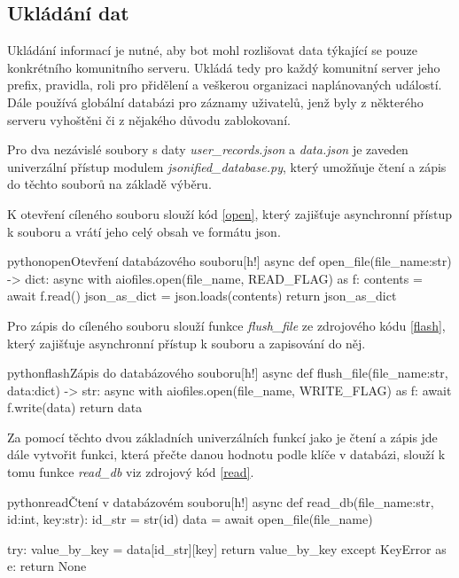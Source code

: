 \documentclass[
  program=inf,
biblatex=false,
sourcecodes=true,
joinlists=true,
  figures=true,
  tables=true,
  glossaries=true,
  index=false
]{kidiplom}
\begin{document}
\subsection{Ukládání dat}
Ukládání informací je nutné, aby bot mohl rozlišovat data týkající se pouze konkrétního
komunitního serveru. Ukládá tedy pro každý komunitní server jeho prefix, pravidla, roli pro přidělení
a veškerou organizaci naplánovaných událostí. Dále používá globální databázi pro záznamy
uživatelů, jenž byly z některého serveru vyhoštěni či z nějakého důvodu zablokovaní.

Pro dva nezávislé soubory s daty {\it user\_records.json} a {\it data.json} je zaveden 
univerzální přístup modulem {\it jsonified\_database.py}, který umožňuje čtení a zápis
do těchto souborů na základě výběru.

K otevření cíleného souboru slouží kód \ref{open}, který zajišťuje asynchronní
přístup k souboru a vrátí jeho celý obsah ve formátu \acrshort{json}.

\begin{kicode}{python}{open}{Otevření databázového souboru}[h!]
  async def open_file(file_name:str) -> dict:
    async with aiofiles.open(file_name, READ_FLAG) as f:
        contents = await f.read()
        json_as_dict = json.loads(contents)
    return json_as_dict
\end{kicode}

\newpage
Pro zápis do cíleného souboru slouží funkce {\it flush\_file} ze zdrojového kódu \ref{flash}, který
zajišťuje asynchronní přístup k souboru a zapisování do něj.

\begin{kicode}{python}{flash}{Zápis do databázového souboru}[h!]
  async def flush_file(file_name:str, data:dict) -> str:
      async with aiofiles.open(file_name, WRITE_FLAG) as f:
          await f.write(data)
      return data
\end{kicode}

Za pomocí těchto dvou základních univerzálních funkcí jako je čtení a zápis jde dále
vytvořit funkci, která přečte danou hodnotu podle klíče v databázi, slouží k tomu funkce
{\it read\_db} viz zdrojový kód \ref{read}.

\begin{kicode}{python}{read}{Čtení v databázovém souboru}[h!]
  async def read_db(file_name:str, id:int, key:str): 
    id_str = str(id)
    data = await open_file(file_name)

    try:
        value_by_key = data[id_str][key]
        return value_by_key
    except KeyError as e:
        return None
\end{kicode}
\end{document}
